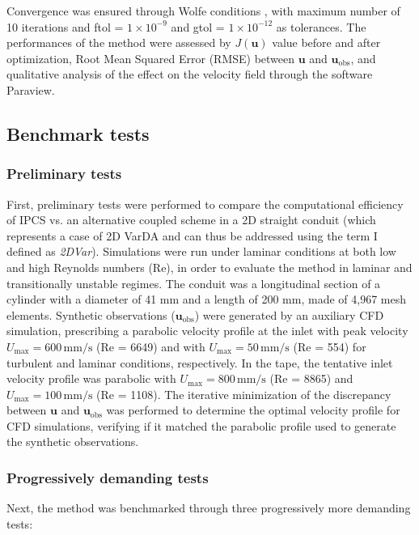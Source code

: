 Convergence was ensured through Wolfe conditions \citep{Nocedal2006}, with maximum number of 10 iterations and ftol = $1 \times 10^{-9}$ and gtol = $1 \times 10^{-12}$ as tolerances.
The performances of the method were assessed by $J(\mathbf{u})$ value before and after optimization, Root Mean Squared Error (RMSE) between \( \mathbf{u}\) and \( \mathbf{u}_{\text{obs}} \), and qualitative analysis of the effect on the velocity field through the software Paraview.

\subsection*{Benchmark tests}

\label{sec:bench}
\subsubsection*{Preliminary tests}
First, preliminary tests were performed to compare the computational efficiency of IPCS vs. an alternative coupled scheme \citep{Figueroa2006} in a 2D straight conduit (which represents a case of 2D VarDA and can thus be addressed using the term I defined as \emph{2DVar}). Simulations were run under laminar conditions at both low and high Reynolds numbers (Re), in order to evaluate the method in laminar and transitionally unstable regimes.  
The conduit was a longitudinal section of a cylinder with a diameter of 41 mm and a length of 200 mm, made of 4,967 mesh elements. Synthetic observations (\( \mathbf{u}_{\text{obs}} \)) were generated by an auxiliary CFD simulation, prescribing a parabolic velocity profile at the inlet with peak velocity \( U_{\text{max}} = 600 \, \text{mm/s} \) (Re = 6649) and with \( U_{\text{max}} = 50 \, \text{mm/s} \) (Re = 554) for turbulent and laminar conditions, respectively.
In the tape, the tentative inlet velocity profile was parabolic with \( U_{\text{max}} = 800 \, \text{mm/s} \) (Re = 8865) and \( U_{\text{max}} = 100 \, \text{mm/s} \) (Re = 1108).
The iterative minimization of the discrepancy between \( \mathbf{u} \) and \( \mathbf{u}_{\text{obs}} \) was performed to determine the optimal velocity profile for CFD simulations, verifying if it matched the parabolic profile used to generate the synthetic observations.\\


\subsubsection*{Progressively demanding tests}
Next, the method was benchmarked through three progressively more demanding tests:

